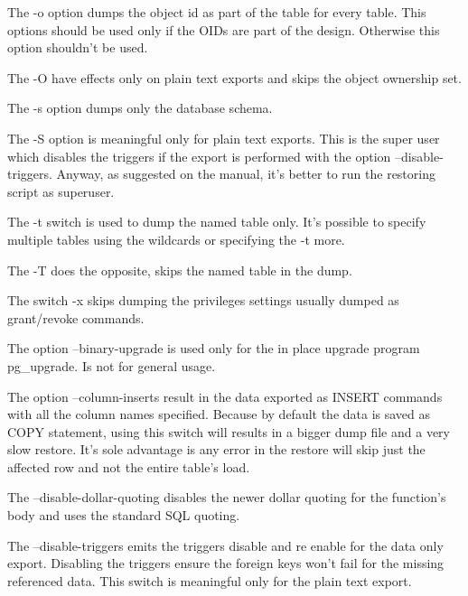 The -o option dumps the object id as part of the table for every table. This options should be 
used only if the OIDs are part of the design. Otherwise this option shouldn't be used.\newline

The -O have effects only on plain text exports and skips the object ownership set.\newline

The -s option dumps only the database schema.\newline


The -S option is meaningful only for plain text exports. This is the super user which disables the 
triggers if the export is performed with the option --disable-triggers. Anyway, as suggested on the 
manual, it's better to run the restoring script as superuser.\newline

The -t switch is used to dump the named table only. It's possible to specify multiple tables using 
the wildcards or specifying the -t more.\newline

The -T does the opposite, skips the named table in the dump.\newline

The switch -x skips dumping the privileges settings usually dumped as grant/revoke commands.\newline

The option --binary-upgrade is used only for the in place upgrade program pg\_upgrade. Is not 
for general usage. 

The option --column-inserts result in the data exported as INSERT commands with all the column 
names specified. Because by default the data is saved as COPY statement, using this switch will 
results in a bigger dump file and a very slow restore. It's sole advantage is any error in the 
restore will skip just the affected row and not the entire table's load.\newline

The --disable-dollar-quoting disables the newer dollar quoting for the function's body and uses the 
standard SQL quoting.\newline

The --disable-triggers emits the triggers disable 
and re enable for the data only export. Disabling the triggers ensure the foreign keys won't fail 
for the missing referenced data. This switch is meaningful only for the plain text export.\newline

